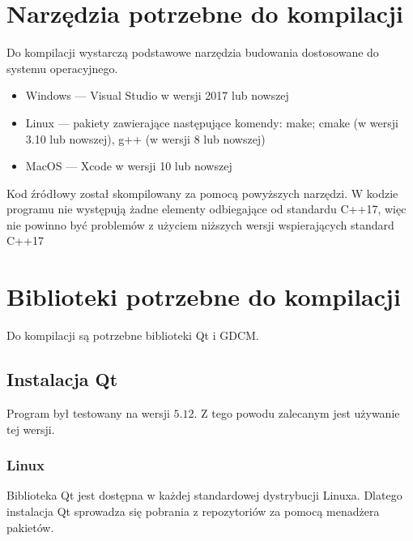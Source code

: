 

\section{Narzędzia potrzebne do kompilacji}

\par
Do kompilacji wystarczą podstawowe narzędzia budowania dostosowane do systemu operacyjnego.

\begin{itemize}
    \item Windows --- Visual Studio w wersji 2017 lub nowszej
    \item Linux --- pakiety zawierające następujące komendy: make; cmake (w wersji 3.10 lub nowszej), g++ (w wersji 8 lub nowszej)
    \item MacOS --- Xcode w wersji 10 lub nowszej
\end{itemize}

Kod źródłowy został skompilowany za pomocą powyższych narzędzi.
W kodzie programu nie występują żadne elementy odbiegające od standardu C++17, więc nie powinno być problemów z użyciem niższych wersji wspierających standard C++17

\section{Biblioteki potrzebne do kompilacji}

Do kompilacji są potrzebne biblioteki Qt i GDCM.

\subsection{Instalacja Qt}

Program był testowany na wersji $5.12$.
Z tego powodu zalecanym jest używanie tej wersji.

\subsubsection*{Linux}

Biblioteka Qt jest dostępna w każdej standardowej dystrybucji Linuxa.
Dlatego instalacja Qt sprowadza się pobrania z repozytoriów za pomocą menadżera pakietów.

